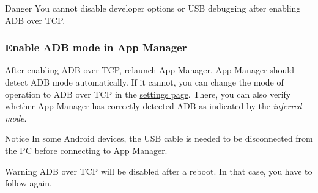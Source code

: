 \begin{danger}{Danger}
    You cannot disable developer options or USB debugging after enabling ADB over TCP\@.
\end{danger}

\subsubsection{Enable ADB mode in App Manager}\label{subsubsec:adb-mode-in-app-manager} %
After enabling ADB over TCP, relaunch App Manager. App Manager should detect ADB mode automatically. If it cannot,
you can change the mode of operation to ADB over TCP in the \hyperref[subsec:mode-of-operation]{settings page}.
There, you can also verify whether App Manager has correctly detected ADB as indicated by the \textit{inferred mode}.

\begin{tip}{Notice}
    In some Android devices, the USB cable is needed to be disconnected from the PC before connecting to App Manager.
\end{tip}

\begin{warning}{Warning}
    ADB over TCP will be disabled after a reboot. In that case, you have to follow  again.
\end{warning}
